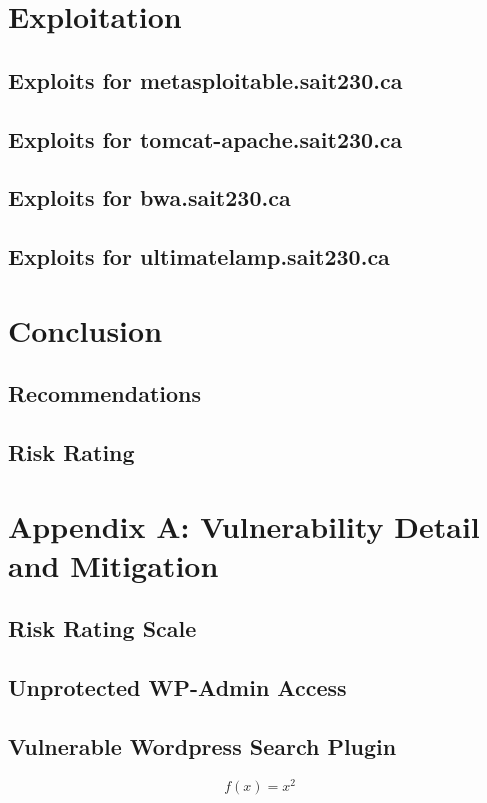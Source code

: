 \documentclass{article}
\begin{document}
\newpage
\section{Exploitation}
\subsection{Exploits for metasploitable.sait230.ca}
\subsection{Exploits for tomcat-apache.sait230.ca}
\subsection{Exploits for bwa.sait230.ca}
\subsection{Exploits for ultimatelamp.sait230.ca}

\newpage
\section{Conclusion}
\subsection{Recommendations}
\subsection{Risk Rating}

\newpage
\section{Appendix A: Vulnerability Detail and Mitigation}
\subsection{Risk Rating Scale}
\subsection{Unprotected WP-Admin Access}
\subsection{Vulnerable Wordpress Search Plugin}

\begin{equation*}
	f(x) = x^2
\end{equation*}
\end{document}
